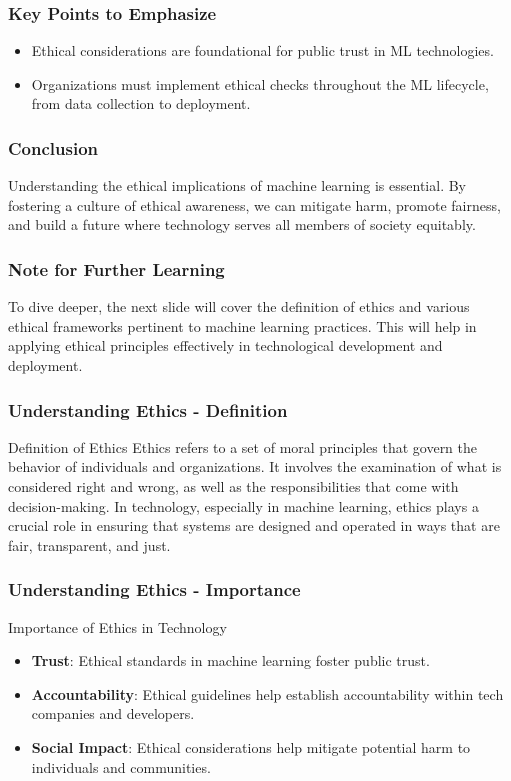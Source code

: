 \documentclass[aspectratio=169]{beamer}
\begin{document}
\begin{frame}[fragile]
    \frametitle{Key Points to Emphasize}
    \begin{itemize}
        \item Ethical considerations are foundational for public trust in ML technologies.
        \item Organizations must implement ethical checks throughout the ML lifecycle, from data collection to deployment.
    \end{itemize}
\end{frame}

\begin{frame}[fragile]
    \frametitle{Conclusion}
    Understanding the ethical implications of machine learning is essential. By fostering a culture of ethical awareness, we can mitigate harm, promote fairness, and build a future where technology serves all members of society equitably.
\end{frame}

\begin{frame}[fragile]
    \frametitle{Note for Further Learning}
    To dive deeper, the next slide will cover the definition of ethics and various ethical frameworks pertinent to machine learning practices. This will help in applying ethical principles effectively in technological development and deployment.
\end{frame}

\begin{frame}[fragile]
    \frametitle{Understanding Ethics - Definition}
    \begin{block}{Definition of Ethics}
        Ethics refers to a set of moral principles that govern the behavior of individuals and organizations. It involves the examination of what is considered right and wrong, as well as the responsibilities that come with decision-making. In technology, especially in machine learning, ethics plays a crucial role in ensuring that systems are designed and operated in ways that are fair, transparent, and just.
    \end{block}
\end{frame}

\begin{frame}[fragile]
    \frametitle{Understanding Ethics - Importance}
    \begin{block}{Importance of Ethics in Technology}
        \begin{itemize}
            \item \textbf{Trust}: Ethical standards in machine learning foster public trust. 
            \item \textbf{Accountability}: Ethical guidelines help establish accountability within tech companies and developers.
            \item \textbf{Social Impact}: Ethical considerations help mitigate potential harm to individuals and communities.
        \end{itemize}
    \end{block}
\end{frame}
\end{document}
